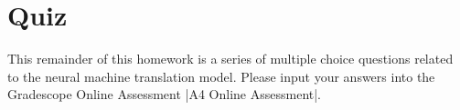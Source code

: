 \section{Quiz}

 This remainder of this homework is a series of multiple choice questions related to the neural machine translation model. Please input your answers into the Gradescope Online Assessment |A4 Online Assessment|.
